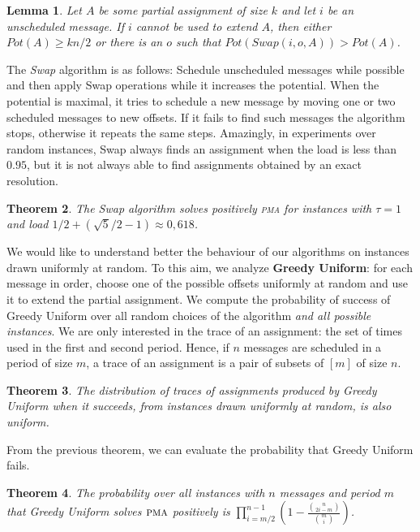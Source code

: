\documentclass[10pt, conference, letterpaper]{algotel}
\newtheorem{theorem}{Theorem}
\newtheorem{lemma}[theorem]{Lemma}
\newcommand\pma{\textsc{pma}\xspace}
\begin{document}
\begin{lemma}\label{lemma:swap}
Let $A$ be some partial assignment of size $k$ and let $i$ be an unscheduled message. If $i$ cannot be used to extend $A$, then either $Pot(A) \geq kn/2$ or there is an $o$ such that $Pot(Swap(i,o,A)) > Pot(A)$.
\end{lemma}

The \emph{Swap} algorithm is as follows: Schedule unscheduled messages while possible and then apply Swap operations while it increases the potential. When the potential is maximal, it tries to schedule a new message by moving one or two scheduled messages to new offsets. If it fails to find such messages the algorithm stops, otherwise it repeats the same steps. 
Amazingly, in experiments over random instances, Swap always finds an assignment when the load is less than $0.95$, but it is not always able to find assignments obtained by an exact resolution. 

\begin{theorem}
The Swap algorithm solves positively \pma for instances with $\tau =1$ and load $1/2 + (\sqrt{5}/2 -1) \approx 0,618$.
\end{theorem}


We would like to understand better the behaviour of our algorithms
on instances drawn uniformly at random. To this aim, we analyze \textbf{Greedy Uniform}: for each message in order, choose one of the possible offsets uniformly at random and use it to extend the partial assignment. We compute the probability of success of Greedy Uniform over all random choices of the algorithm \emph{and all possible instances}. We are only interested in the trace of an assignment: the set of times used in the first and second period. Hence, if $n$ messages are scheduled in a period of size $m$, a trace of an assignment is a pair of subsets of $[m]$ of size $n$.

\begin{theorem}
The distribution of traces of assignments produced by Greedy Uniform when it succeeds, from instances drawn uniformly at random, is also uniform.
\end{theorem}

From the previous theorem, we can evaluate the probability that Greedy Uniform fails.

\begin{theorem}\label{theorem:uniform}
The probability over all instances with $n$ messages and period $m$ that Greedy Uniform solves $\pma$ positively is $\displaystyle{\prod_{i=m/2}^{n-1}(1 - \frac{\binom{n}{2i-m}}{\binom{m}{i}})}$.
\end{theorem}
\end{document}
